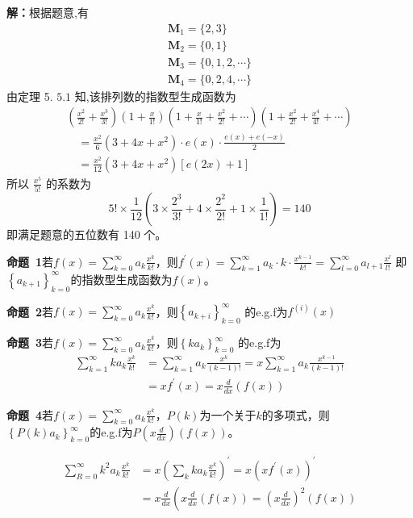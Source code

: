 \documentclass{report}
\begin{document}
\textbf{解：}根据题意,有
$$
\begin{array}{l}
\boldsymbol{M}_{1}=\{2,3\} \\
\boldsymbol{M}_{2}=\{0,1\} \\
\boldsymbol{M}_{3}=\{0,1,2, \cdots\} \\
\boldsymbol{M}_{4}=\{0,2,4, \cdots\}
\end{array}
$$
由定理 5. $5.1$ 知,该排列数的指数型生成函数为
$$
\begin{array}{l}
\left(\frac{x^{2}}{2 !}+\frac{x^{3}}{3 !}\right)\left(1+\frac{x}{1 !}\right)\left(1+\frac{x}{1 !}+\frac{x^{2}}{2 !}+\cdots\right)\left(1+\frac{x^{2}}{2 !}+\frac{x^{4}}{4 !}+\cdots\right) \\
\quad=\frac{x^{2}}{6}\left(3+4 x+x^{2}\right) \cdot e(x) \cdot \frac{e(x)+e(-x)}{2} \\
\quad=\frac{x^{2}}{12}\left(3+4 x+x^{2}\right)[e(2 x)+1]
\end{array}
$$
所以 $\frac{x^{5}}{5 !}$ 的系数为
$$
5 ! \times \frac{1}{12}\left(3 \times \frac{2^{3}}{3 !}+4 \times \frac{2^{2}}{2 !}+1 \times \frac{1}{1 !}\right)=140
$$
即满足题意的五位数有 140 个。

\textbf{命题\ 1}若$f(x)=\sum_{k=0}^{\infty} a_{k} \frac{x^{k}}{k !}$，则$f^{\prime}(x)=\sum_{k=1}^{\infty} a_{k} \cdot k \cdot \frac{x^{k-1}}{k !}=\sum_{l=0}^{\infty} a_{l+1} \frac{x^{l}}{l !}$
即$\left\{a_{k+1}\right\}_{k=0}^{\infty}$的指数型生成函数为$f(x)$。

\textbf{命题\ 2}若$f(x)=\sum_{k=0}^{\infty} a_{k} \frac{x^{k}}{k !}$，则$\left\{a_{k+i}\right\}_{k=0}^{\infty}$
的e.g.f为$f^{ (i) }(x)$

\textbf{命题\ 3}若$f(x)=\sum_{k=0}^{\infty} a_{k} \frac{x^{k}}{k !}$，则$\left\{ka_{k}\right\}_{k=0}^{\infty}$
的e.g.f为
$$
\begin{aligned}
\sum_{k=1}^{\infty} k a_{k} \frac{x^{k}}{k !} &=\sum_{k=1}^{\infty} a_{k} \frac{x^{k}}{(k-1) !}=x \sum_{k=1}^{\infty} a_{k} \frac{x^{k-1}}{(k-1) !} \\
&=x f^{\prime}(x)=x \frac{d}{d x}(f(x))
\end{aligned}
$$

\textbf{命题\ 4}若$f(x)=\sum_{k=0}^{\infty} a_{k} \frac{x^{k}}{k !}$，$P(k)$为一个关于$k$的多项式，则
$\left\{P(k)a_{k}\right\}_{k=0}^{\infty}$的e.g.f为$P\left(x \frac{d}{d x}\right)(f(x))$。

$$
\begin{aligned}
\sum_{R=0}^{\infty} k^{2} a_{k} \frac{x^{k}}{k !} &=x\left(\sum_{k} k a_{k} \frac{x^{k}}{k !}\right)^{\prime}=x\left(x f^{\prime}(x)\right)^{\prime} \\
&=x \frac{d}{d x}\left(x \frac{d}{d x}(f(x))=\left(x \frac{d}{d x}\right)^{2}(f(x))\right.
\end{aligned}
$$
\end{document}
